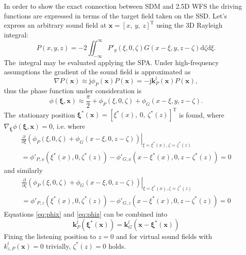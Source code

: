 \documentclass[12pt,a4paper]{article}
\newcommand{\td}{\mathrm{d}}
\newcommand{\ti}{\mathrm{j}}
\newcommand{\vx}{\mathbf{x}}
\newcommand{\vxi}{\bm{\xi}}
\newcommand{\vk}{\mathbf{k}}
\begin{document}
In order to show the exact connection between SDM and 2.5D WFS the driving functions are expressed in terms of the target field taken on the SSD.
Let's express an arbitrary sound field at $\vx = [x,\ y,\ z]^{\mathrm{T}}$ using the 3D Rayleigh integral:
\begin{equation}
P(x,y,z) = -2 \iint_{-\infty}^{\infty} P'_y(\xi,0,\zeta) G(x-\xi,y,z-\zeta) \td \zeta \td \xi.
\end{equation}
The~integral may be evaluated applying the SPA.
Under high-frequency assumptions the gradient of the sound field is approximated as
\begin{equation}
\nabla P(\vx) \approx \ti \phi_P(\vx) P(\vx) = -\ti \vk_P^l(\vx) P(\vx),
\end{equation}
%
thus the phase function under consideration is
%
\begin{equation}
\phi(\vxi,\vx) \approx \frac{\pi}{2} + \phi_P(\xi,0,\zeta) + \phi_G(x-\xi,y,z-\zeta).
\label{eq:Rayleigh_phase}
\end{equation}
%
The~stationary position
$\vxi^*(\vx) = [\xi^*(x),\ 0,\ \zeta^*(z)]^{\mathrm{T}}$
is found, where
$\nabla_{\vxi} \phi(\vxi,\vx) = 0$,
i.e. where
\begin{eqnarray}
\left.
\frac{\partial}{\partial \xi} \left( \phi_P(\xi,0,\zeta) + \phi_G(x-\xi,0,z-\zeta) \right)\right|_{\xi = \xi^*(x), \zeta = \zeta^*(z)} \nonumber \\
=
\phi'_{P,x}(\xi^*(x),0,\zeta^*(z)) - \phi'_{G,x}(x-\xi^*(x),0,z-\zeta^*(z)) = 0
\label{eq:phix}
\end{eqnarray}
%
and similarly
%
\begin{eqnarray}
\left. \frac{\partial}{\partial \zeta} \left( \phi_P(\xi,0,\zeta) + \phi_G(x-\xi,0,z-\zeta) \right)\right|_{\xi = \xi^*(x), \zeta = \zeta^*(z)} \nonumber \\
=
\phi'_{P,z}(\xi^*(x),0,\zeta^*(z)) - \phi'_{G,z}(x-\xi^*(x),0,z-\zeta^*(z)) = 0
\label{eq:phiz}
\end{eqnarray}
%
Equations \eqref{eq:phix} and \eqref{eq:phiz} can be combined into
%
\begin{equation}
\vk^l_P(\vxi^*(\vx)) = \vk^l_G(\vx - \vxi^*(\vx))
\label{eq:rayleigh_stat_point}
\end{equation}
%
Fixing the listening position to $z=0$ and for virtual sound fields with $k^l_{z,P}(\vx) = 0$ trivially, $\zeta^*(z) = 0$ holds.
\end{document}

